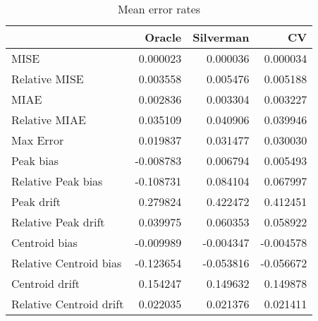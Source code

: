 \begin{table}[ht]
\centering
\begin{tabular}{lrrr}
  \hline
 & Oracle & Silverman & CV \\ 
  \hline
MISE & 0.000023 & 0.000036 & 0.000034 \\ 
  Relative MISE & 0.003558 & 0.005476 & 0.005188 \\ 
  MIAE & 0.002836 & 0.003304 & 0.003227 \\ 
  Relative MIAE & 0.035109 & 0.040906 & 0.039946 \\ 
  Max Error & 0.019837 & 0.031477 & 0.030030 \\ 
  Peak bias & -0.008783 & 0.006794 & 0.005493 \\ 
  Relative Peak bias & -0.108731 & 0.084104 & 0.067997 \\ 
  Peak drift & 0.279824 & 0.422472 & 0.412451 \\ 
  Relative Peak drift & 0.039975 & 0.060353 & 0.058922 \\ 
  Centroid bias & -0.009989 & -0.004347 & -0.004578 \\ 
  Relative Centroid bias & -0.123654 & -0.053816 & -0.056672 \\ 
  Centroid drift & 0.154247 & 0.149632 & 0.149878 \\ 
  Relative Centroid drift & 0.022035 & 0.021376 & 0.021411 \\ 
   \hline
\end{tabular}
\caption{Mean error rates} 
\label{tbl:mean_error_rates}
\end{table}
